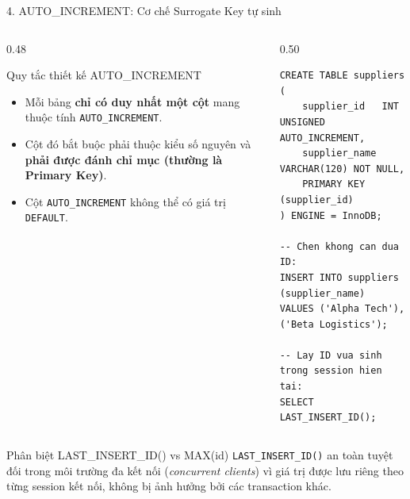 \documentclass[aspectratio=169,11pt]{beamer}
\newcommand{\kw}[1]{\textcolor{dbblue}{\textbf{#1}}}
\begin{document}
\begin{frame}[fragile]{4. AUTO\_INCREMENT: Cơ chế Surrogate Key tự sinh}
\begin{columns}[t]
  \begin{column}{0.48\textwidth}
    \begin{block}{Quy tắc thiết kế AUTO\_INCREMENT}
      \begin{itemize}\setlength{\itemsep}{1.5pt}
        \item Mỗi bảng \kw{chỉ có duy nhất một cột} mang thuộc tính \texttt{AUTO\_INCREMENT}.
        \item Cột đó bắt buộc phải thuộc kiểu số nguyên và \kw{phải được đánh chỉ mục (thường là Primary Key)}.
        \item Cột \texttt{AUTO\_INCREMENT} không thể có giá trị \texttt{DEFAULT}.
      \end{itemize}
    \end{block}
  \end{column}
  \begin{column}{0.50\textwidth}
\begin{lstlisting}
CREATE TABLE suppliers (
    supplier_id   INT UNSIGNED AUTO_INCREMENT,
    supplier_name VARCHAR(120) NOT NULL,
    PRIMARY KEY (supplier_id)
) ENGINE = InnoDB;

-- Chen khong can dua ID:
INSERT INTO suppliers (supplier_name)
VALUES ('Alpha Tech'), ('Beta Logistics');

-- Lay ID vua sinh trong session hien tai:
SELECT LAST_INSERT_ID();
\end{lstlisting}
  \end{column}
\end{columns}

\begin{alertblock}{Phân biệt LAST\_INSERT\_ID() vs MAX(id)}
  \texttt{LAST\_INSERT\_ID()} an toàn tuyệt đối trong môi trường đa kết nối (\textit{concurrent clients}) vì giá trị được lưu riêng theo từng session kết nối, không bị ảnh hưởng bởi các transaction khác.
\end{alertblock}
\end{frame}
\end{document}
